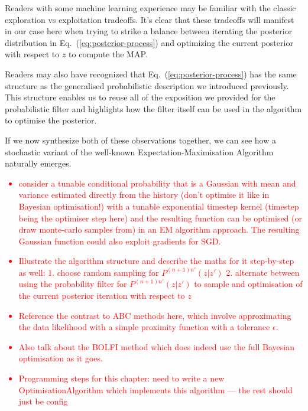 Readers with some machine learning experience may be familiar with the classic exploration vs exploitation tradeoffs. It's clear that these tradeoffs will manifest in our case here when trying to strike a balance between iterating the posterior distribution in Eq.~(\ref{eq:posterior-process}) and optimizing the current posterior with respect to $z$ to compute the MAP. 

Readers may also have recognized that Eq.~(\ref{eq:posterior-process}) has the same structure as the generalised probabilistic description we introduced previously. This structure enables us to reuse all of the exposition we provided for the probabilistic filter and highlights how the filter itself can be used in the algorithm to optimise the posterior.   

If we now synthesize both of these observations together, we can see how a stochastic variant of the well-known Expectation-Maximisation Algorithm~\cite{hartley1958maximum, dempster1977maximum, murphy2012machine} naturally emerges.

\textcolor{red}{\begin{itemize}
\item{consider a tunable conditional probability that is a Gaussian with mean and variance estimated directly from the history (don't optimise it like in Bayesian optimisation!) with a tunable exponential timestep kernel (timestep being the optimiser step here) and the resulting function can be optimised (or draw monte-carlo samples from) in an EM algorithm approach. The resulting Gaussian function could also exploit gradients for SGD.}
\item{Illustrate the algorithm structure and describe the maths for it step-by-step as well: 1. choose random sampling for $P^{(n+1)n'}(z\vert z')$ 2. alternate between using the probability filter for $P^{(n+1)n'}(z\vert z')$ to sample and optimisation of the current posterior iteration with respect to $z$}
\item{Reference the contrast to ABC methods here, which involve approximating the data likelihood with a simple proximity function with a tolerance $\epsilon$.}
\item{Also talk about the BOLFI method which does indeed use the full Bayesian optimisation as it goes.}
\item{Programming steps for this chapter: need to write a new OptimisationAlgorithm which implements this algorithm --- the rest should just be config}
\end{itemize}}

